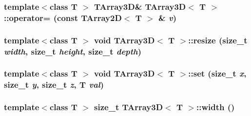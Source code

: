 \hypertarget{classTArray3D_ad9eaf10799832b1ac819caaed368d7c1}{
\subsubsection[{operator=}]{\setlength{\rightskip}{0pt plus 5cm}template$<$class T $>$ {\bf TArray3D}\& {\bf TArray3D}$<$ T $>$::operator= (const {\bf TArray2D}$<$ T $>$ \& {\em v})}}
\label{classTArray3D_ad9eaf10799832b1ac819caaed368d7c1}
\hypertarget{classTArray3D_a1679bd8e604f7ee577b4d5948e217ef4}{
\subsubsection[{resize}]{\setlength{\rightskip}{0pt plus 5cm}template$<$class T $>$ void {\bf TArray3D}$<$ T $>$::resize (size\_\-t {\em width}, \/  size\_\-t {\em height}, \/  size\_\-t {\em depth})}}
\label{classTArray3D_a1679bd8e604f7ee577b4d5948e217ef4}
\hypertarget{classTArray3D_a7324dc8c8bce78dce247c32a6f861c5f}{
\subsubsection[{set}]{\setlength{\rightskip}{0pt plus 5cm}template$<$class T $>$ void {\bf TArray3D}$<$ T $>$::set (size\_\-t {\em x}, \/  size\_\-t {\em y}, \/  size\_\-t {\em z}, \/  T {\em val})}}
\label{classTArray3D_a7324dc8c8bce78dce247c32a6f861c5f}
\hypertarget{classTArray3D_ac60676bad65591c46ed744bff1694908}{
\subsubsection[{width}]{\setlength{\rightskip}{0pt plus 5cm}template$<$class T $>$ size\_\-t {\bf TArray3D}$<$ T $>$::width ()}}
\label{classTArray3D_ac60676bad65591c46ed744bff1694908}


